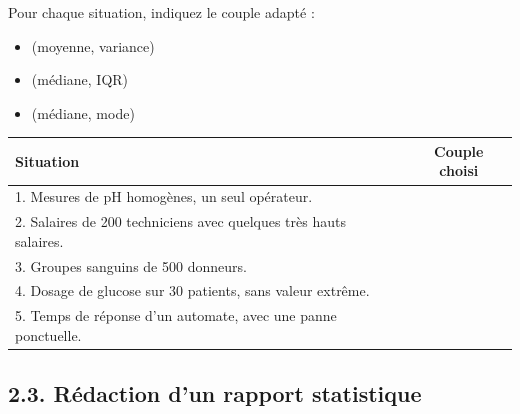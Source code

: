 \documentclass[11pt,a4paper]{article}
\begin{document}
\begin{questionbox}[title={\textbf{Exercice — Associer situation et couple d'indicateurs}}]
Pour chaque situation, indiquez le couple adapté :
\begin{itemize}[leftmargin=*]
    \item[\textbf{(i)}] (moyenne, variance)
    \item[\textbf{(ii)}] (médiane, IQR)
    \item[\textbf{(iii)}] (médiane, mode)
\end{itemize}

\vspace{0.2cm}
\begin{center}
\renewcommand{\arraystretch}{1.5}
\begin{tabularx}{\linewidth}{|X|c|}
\hline
\rowcolor{soft}
\textbf{Situation} & \textbf{Couple choisi} \\ \hline
1. Mesures de pH homogènes, un seul opérateur. & \hspace{2cm} \\ \hline
2. Salaires de 200 techniciens avec quelques très hauts salaires. & \\ \hline
3. Groupes sanguins de 500 donneurs. & \\ \hline
4. Dosage de glucose sur 30 patients, sans valeur extrême. & \\ \hline
5. Temps de réponse d'un automate, avec une panne ponctuelle. & \\ \hline
\end{tabularx}
\end{center}
\end{questionbox}

\subsection*{2.3. Rédaction d'un rapport statistique}
\end{document}
